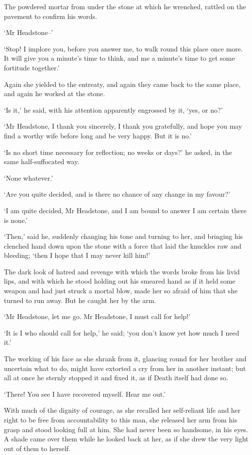 The powdered mortar from under the stone at which he wrenched, rattled
on the pavement to confirm his words.

‘Mr Headstone--’

‘Stop! I implore you, before you answer me, to walk round this place
once more. It will give you a minute’s time to think, and me a minute’s
time to get some fortitude together.’

Again she yielded to the entreaty, and again they came back to the same
place, and again he worked at the stone.

‘Is it,’ he said, with his attention apparently engrossed by it, ‘yes,
or no?’

‘Mr Headstone, I thank you sincerely, I thank you gratefully, and hope
you may find a worthy wife before long and be very happy. But it is no.’

‘Is no short time necessary for reflection; no weeks or days?’ he asked,
in the same half-suffocated way.

‘None whatever.’

‘Are you quite decided, and is there no chance of any change in my
favour?’

‘I am quite decided, Mr Headstone, and I am bound to answer I am certain
there is none.’

‘Then,’ said he, suddenly changing his tone and turning to her, and
bringing his clenched hand down upon the stone with a force that laid
the knuckles raw and bleeding; ‘then I hope that I may never kill him!’

The dark look of hatred and revenge with which the words broke from his
livid lips, and with which he stood holding out his smeared hand as
if it held some weapon and had just struck a mortal blow, made her so
afraid of him that she turned to run away. But he caught her by the arm.

‘Mr Headstone, let me go. Mr Headstone, I must call for help!’

‘It is I who should call for help,’ he said; ‘you don’t know yet how
much I need it.’

The working of his face as she shrank from it, glancing round for her
brother and uncertain what to do, might have extorted a cry from her in
another instant; but all at once he sternly stopped it and fixed it, as
if Death itself had done so.

‘There! You see I have recovered myself. Hear me out.’

With much of the dignity of courage, as she recalled her self-reliant
life and her right to be free from accountability to this man, she
released her arm from his grasp and stood looking full at him. She had
never been so handsome, in his eyes. A shade came over them while
he looked back at her, as if she drew the very light out of them to
herself.

